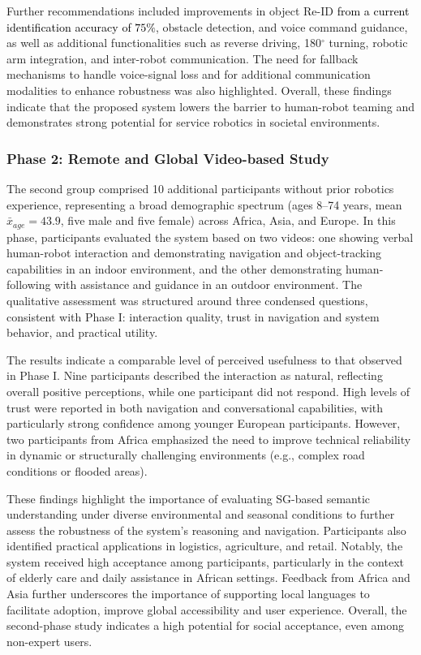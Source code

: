 \documentclass[lettersize,journal]{IEEEtran}
\begin{document}
Further recommendations included improvements in object Re-ID \textcolor{black}{from a current  identification accuracy of $75\%$}, obstacle detection, and voice command guidance, as well as additional functionalities such as reverse driving, 180$^\circ$ turning, robotic arm integration, and inter-robot communication. The need for fallback mechanisms to handle voice-signal loss and for additional communication modalities to enhance robustness was also highlighted. Overall, these findings indicate that the proposed system lowers the barrier to human-robot teaming and demonstrates strong potential for service robotics in societal environments.

\subsubsection{Phase 2: Remote and Global  Video-based Study}
The second group comprised 10 additional participants without prior robotics experience, representing a broad demographic spectrum (ages 8–74 years, mean $\bar{x}_{age} = 43.9$, five male and five female) across Africa, Asia, and Europe. In this phase, participants evaluated the system based on two videos: one showing verbal human-robot interaction and demonstrating navigation and object-tracking capabilities in an indoor environment, and the other demonstrating human-following with assistance and guidance in an outdoor environment. The qualitative assessment was structured around three condensed questions, consistent with Phase I: interaction quality, trust in navigation and system behavior, and practical utility.

The results indicate a comparable level of perceived usefulness to that observed in Phase I. Nine participants described the interaction as natural, reflecting overall positive perceptions, while one participant did not respond. High levels of trust were reported in both navigation and conversational capabilities, with particularly strong confidence among younger European participants. However, two participants from Africa emphasized the need to improve technical reliability in dynamic or structurally challenging environments (e.g., complex road conditions or flooded areas).

These findings highlight the importance of evaluating SG-based semantic understanding under diverse environmental and seasonal conditions to further assess the robustness of the system’s reasoning and navigation. Participants also identified practical applications in logistics, agriculture, and retail. Notably, the system received high acceptance among  participants, particularly in the context of elderly care and daily assistance in African settings. Feedback from Africa and Asia further underscores the importance of supporting local languages to facilitate adoption, improve global accessibility and user experience. Overall, the second-phase study indicates a high potential for social acceptance, even among non-expert users.
\end{document}
